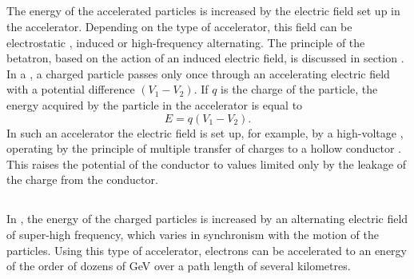 \subsection{}\label{24.4.2} The energy of the accelerated particles is increased by the electric field set up in the accelerator. Depending on the type of accelerator, this field can be electrostatic , induced  or high-frequency alternating. The principle of the betatron, based on the action of an induced electric field, is discussed in section . In a , a charged particle passes only once through an accelerating electric field with a potential difference $(V_{1} - V_{2})$. If $q$ is the charge of the particle, the energy acquired by the particle in the accelerator  is equal to
\begin{equation*}%
E = q(V_{1} - V_{2}).
\end{equation*}
In such an accelerator the electric field is set up, for example, by a  high-voltage , operating by the principle of multiple transfer of charges to a hollow conductor . This raises the potential of the conductor to values limited only by the leakage of the charge from the conductor.

\subsection{}\label{24.4.3} In , the energy of the charged particles is increased by an alternating electric field of super-high frequency, which varies in synchronism with the motion of the particles. Using this type of accelerator, electrons can be accelerated to an energy of the order of dozens of \si{\giga\electronvolt} over a path length of several kilometres.

